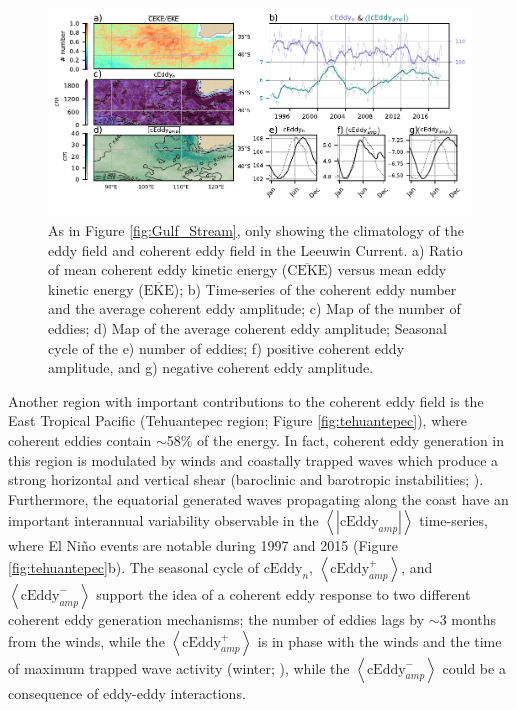 \documentclass[draft,linenumbers]{agujournal2019}
\newcommand{\MEKE}{\overline{\textrm{EKE}}}
\newcommand{\MCEKE}{\overline{\textrm{CEKE}}}
\newcommand{\cEddy}{\textrm{cEddy}}
\begin{document}
	
	\begin{figure}
	    \centering
	    \includegraphics[width=1\textwidth]{figures/regional_ratios_and_stats_V3_0.pdf}
	    \caption{As in Figure \ref{fig:Gulf_Stream}, only showing the  climatology of the eddy field and coherent eddy field in the Leeuwin Current. a) Ratio of mean coherent eddy kinetic energy ($\MCEKE$) versus mean eddy kinetic energy ($\MEKE$); b) Time-series of the coherent eddy number and the average coherent eddy amplitude; c) Map of the number of eddies; d) Map of the average coherent eddy amplitude; Seasonal cycle of the e) number of eddies; f) positive coherent eddy amplitude, and g) negative coherent eddy amplitude.}
	    \label{fig:leeuwin_cycle}
	\end{figure}

	Another region with important contributions to the coherent eddy field is the East Tropical Pacific (Tehuantepec region; Figure \ref{fig:tehuantepec}), where coherent eddies contain $\sim$58\% of the energy. 
	In fact, coherent eddy generation in this region is modulated by winds and coastally trapped waves which produce a strong horizontal and vertical shear (baroclinic and barotropic instabilities; \citealp{Zamudio_Tehuantepec_2006}). 
	Furthermore, the equatorial generated waves propagating along the coast have an important interannual variability observable in the $\left<|\cEddy_{amp}|\right>$ time-series, where El Niño events are notable during 1997 and 2015 (Figure \ref{fig:tehuantepec}b). 
	The seasonal cycle of $\cEddy_{n}$, $\left<\cEddy_{amp}^+\right>$, and $\left<\cEddy_{amp}^-\right>$ support the idea of a coherent eddy response to two different coherent eddy generation mechanisms; the number of eddies lags by $\sim$3 months from the winds, while the $\left<\cEddy_{amp}^+\right>$ is in phase with the winds and the time of maximum trapped wave activity (winter; \citealp{Zamudio_Tehuantepec_2006}), while the $\left<\cEddy_{amp}^-\right>$ could be a consequence of eddy-eddy interactions. 
\end{document}
